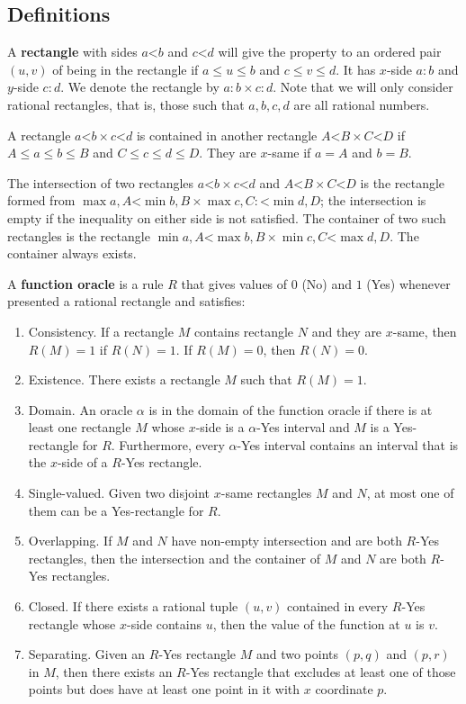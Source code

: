 \documentclass[12pt]{article}
\theoremstyle{remark}
\newcommand{\lt}{\mathord{<}}
\begin{document}
\subsection{Definitions}

A \textbf{rectangle} with sides $a \lt b$ and $c \lt d$ will give the property to an ordered pair $(u, v)$ of being in the rectangle if $a \leq u \leq b$ and $c \leq v \leq d$. It has $x$-side $a:b$ and $y$-side $c:d$. We denote the rectangle by $a:b \times c:d$. Note that we will only consider rational rectangles, that is, those such that $a, b, c, d$ are all rational numbers. 

A rectangle $a \lt b \times c \lt d$ is contained in another rectangle $A \lt B \times C \lt D$ if $A \leq a \leq b \leq B$ and $C \leq c \leq d \leq D$. They are $x$-same if $a=A$ and $b=B$. 

The intersection of two rectangles $a \lt b \times c \lt d$ and $A \lt B \times C \lt D$ is the rectangle formed from $\max{a,A} \lt \min{b,B} \times \max{c, C}: \lt \min{d, D}$; the intersection is empty if the inequality on either side is not satisfied. The container of two such rectangles is the rectangle $\min{a,A} \lt \max{b,B} \times \min{c, C} \lt \max{d, D}$. The container always exists.

A \textbf{function oracle} is a rule $R$ that gives values of $0$ (No) and $1$ (Yes)  whenever presented a rational rectangle and satisfies: 
\begin{enumerate}
    \item Consistency. If a rectangle $M$ contains rectangle $N$ and they are $x$-same, then $R(M)= 1$ if $R(N) =1$. If $R(M) = 0$, then $R(N)= 0$.
    \item Existence. There exists a rectangle $M$ such that $R(M)=1$. 
    \item Domain. An oracle $\alpha$ is in the domain of the function oracle if there is at least one rectangle $M$ whose $x$-side is a $\alpha$-Yes interval and $M$ is a Yes-rectangle for $R$. Furthermore, every $\alpha$-Yes interval contains an interval that is the $x$-side of a $R$-Yes rectangle.
    \item Single-valued. Given two disjoint $x$-same rectangles $M$ and $N$, at most one of them can be a Yes-rectangle for $R$. 
    \item Overlapping. If $M$ and $N$ have non-empty intersection and are both $R$-Yes rectangles, then the intersection and the container of $M$ and $N$ are both $R$-Yes rectangles.
    \item Closed. If there exists a rational tuple $(u,v)$ contained in every $R$-Yes rectangle whose $x$-side contains $u$, then the value of the function at $u$ is $v$.
    \item Separating. Given an $R$-Yes rectangle $M$ and two points $(p, q)$ and $(p, r)$ in $M$, then there exists an $R$-Yes rectangle that excludes at least one of those points but does have at least one point in it with $x$ coordinate $p$. 
\end{enumerate} 
\end{document}
